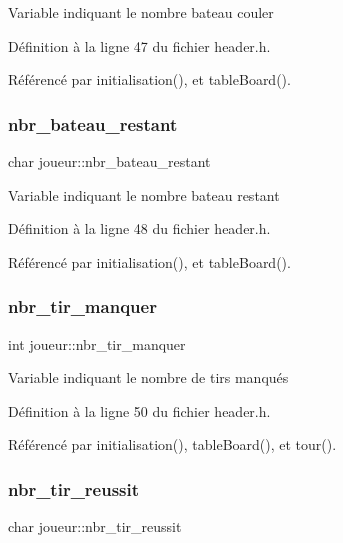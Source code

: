 Variable indiquant le nombre bateau couler 

Définition à la ligne 47 du fichier header.\+h.



Référencé par initialisation(), et table\+Board().

\mbox{\label{structjoueur_a4f902c486f8d66cb85cf3b07abd0bd12}} 
\subsubsection{\texorpdfstring{nbr\+\_\+bateau\+\_\+restant}{nbr\_bateau\_restant}}
{\footnotesize\ttfamily char joueur\+::nbr\+\_\+bateau\+\_\+restant}

Variable indiquant le nombre bateau restant 

Définition à la ligne 48 du fichier header.\+h.



Référencé par initialisation(), et table\+Board().

\mbox{\label{structjoueur_aaba095a23d03a15d363924e77caa3c1e}} 
\subsubsection{\texorpdfstring{nbr\+\_\+tir\+\_\+manquer}{nbr\_tir\_manquer}}
{\footnotesize\ttfamily int joueur\+::nbr\+\_\+tir\+\_\+manquer}

Variable indiquant le nombre de tirs manqués 

Définition à la ligne 50 du fichier header.\+h.



Référencé par initialisation(), table\+Board(), et tour().

\mbox{\label{structjoueur_a19510a02b4ff3f6336da487b50806d71}} 
\subsubsection{\texorpdfstring{nbr\+\_\+tir\+\_\+reussit}{nbr\_tir\_reussit}}
{\footnotesize\ttfamily char joueur\+::nbr\+\_\+tir\+\_\+reussit}

